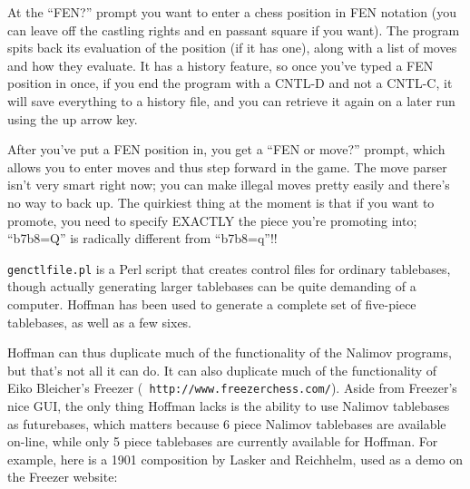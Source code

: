 \documentclass[11pt]{article}
\begin{document}
At the ``FEN?'' prompt you want to enter a chess position in FEN
notation (you can leave off the castling rights and en passant square
if you want).  The program spits back its evaluation of the position
(if it has one), along with a list of moves and how they evaluate.  It
has a history feature, so once you've typed a FEN position in once, if
you end the program with a CNTL-D and not a CNTL-C, it will save
everything to a history file, and you can retrieve it again on a later
run using the up arrow key.

After you've put a FEN position in, you get a ``FEN or move?'' prompt,
which allows you to enter moves and thus step forward in the game.
The move parser isn't very smart right now; you can make illegal moves
pretty easily and there's no way to back up.  The quirkiest thing at
the moment is that if you want to promote, you need to specify EXACTLY
the piece you're promoting into; ``b7b8=Q'' is radically different from
``b7b8=q''!!

{\tt genctlfile.pl} is a Perl script that creates control files for
ordinary tablebases, though actually generating larger tablebases can
be quite demanding of a computer.  Hoffman has been used to generate a
complete set of five-piece tablebases, as well as a few sixes.

Hoffman can thus duplicate much of the functionality of the Nalimov
programs, but that's not all it can do.  It can also duplicate much of
the functionality of Eiko Bleicher's Freezer ({\tt
http://www.freezerchess.com/}).  Aside from Freezer's nice GUI, the
only thing Hoffman lacks is the ability to use Nalimov tablebases as
futurebases, which matters because 6 piece Nalimov tablebases are
available on-line, while only 5 piece tablebases are currently
available for Hoffman.  For example, here is a 1901 composition by
Lasker and Reichhelm, used as a demo on the Freezer website:

\showboard
\end{document}
